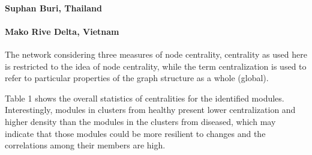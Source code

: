 \paragraph{Suphan Buri, Thailand}


\paragraph{Mako Rive Delta, Vietnam}


The network considering three measures of node centrality, centrality as used here is restricted to the idea of node centrality, while the term centralization is used to refer to particular properties of the graph structure as a whole (global).

Table 1 shows the overall statistics of centralities for the identified modules. Interestingly, modules in clusters from healthy  present lower centralization and higher density than the modules in the clusters from diseased, which may indicate that those modules could be more resilient to changes and the correlations among their members are high.


%





